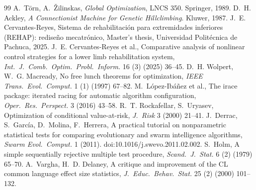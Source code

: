 \documentclass[10pt,journal,compsoc]{IEEEtran}
\begin{document}
\begin{thebibliography}{99}
 A.~T\"orn, A.~\v{Z}ilinskas, \emph{Global Optimization}, LNCS 350. Springer, 1989.
 D.~H. Ackley, \emph{A Connectionist Machine for Genetic Hillclimbing}. Kluwer, 1987.
 J.~E. Cervantes-Reyes, Sistema de rehabilitaci\'on para extremidades inferiores (REHAP): redise\~no mecatr\'onico, Master's thesis, Universidad Polit\'ecnica de Pachuca, 2025.
 J.~E. Cervantes-Reyes et al., Comparative analysis of nonlinear control strategies for a lower limb rehabilitation system, \emph{Int.\ J.\ Comb.\ Optim.\ Probl.\ Inform.} 16 (3) (2025) 36--45.
 D.~H. Wolpert, W.~G. Macready, No free lunch theorems for optimization, \emph{IEEE Trans.\ Evol.\ Comput.} 1 (1) (1997) 67--82.
 M.~L\'opez-Ib\'a\~nez et al., The irace package: iterated racing for automatic algorithm configuration, \emph{Oper.\ Res.\ Perspect.} 3 (2016) 43--58.
 R.~T. Rockafellar, S.~Uryasev, Optimization of conditional value-at-risk, \emph{J.\ Risk} 3 (2000) 21--41.
 J.~Derrac, S.~Garc\'ia, D.~Molina, F.~Herrera, A practical tutorial on nonparametric statistical tests for comparing evolutionary and swarm intelligence algorithms, \emph{Swarm Evol.\ Comput.} 1 (2011). doi:10.1016/j.swevo.2011.02.002.
 S.~Holm, A simple sequentially rejective multiple test procedure, \emph{Scand.\ J.\ Stat.} 6 (2) (1979) 65--70.
 A.~Vargha, H.~D. Delaney, A critique and improvement of the CL common language effect size statistics, \emph{J.\ Educ.\ Behav.\ Stat.} 25 (2) (2000) 101--132.
\end{thebibliography}
\endgroup
\end{document}
